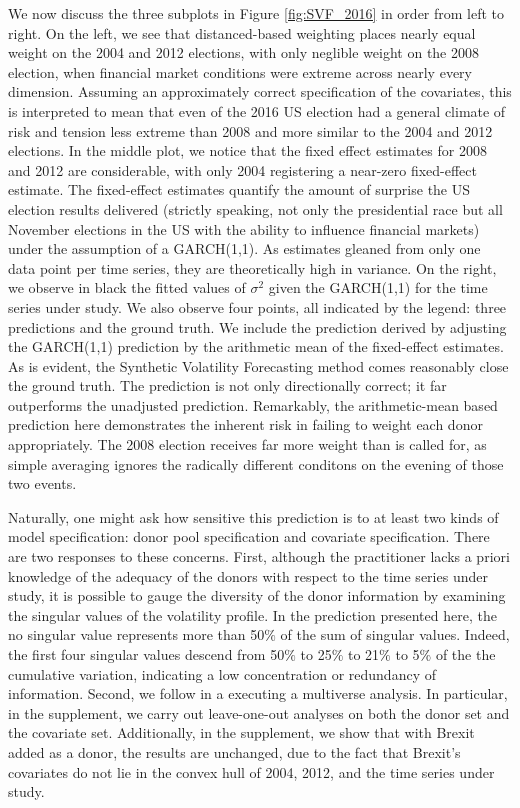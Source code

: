\documentclass[11pt]{article}
\theoremstyle{definition}
\begin{document}
We now discuss the three subplots in Figure \ref{fig:SVF_2016} in order from left to right.  On the left, we see that distanced-based weighting places nearly equal weight on the 2004 and 2012 elections, with only neglible weight on the 2008 election, when financial market conditions were extreme across nearly every dimension.  Assuming an approximately correct specification of the covariates, this is interpreted to mean that even of the 2016 US election had a general climate of risk and tension less extreme than 2008 and more similar to the 2004 and 2012 elections.  In the middle plot, we notice that the fixed effect estimates for 2008 and 2012 are considerable, with only 2004 registering a near-zero fixed-effect estimate.  The fixed-effect estimates quantify the amount of surprise the US election results delivered (strictly speaking, not only the presidential race but all November elections in the US with the ability to influence financial markets) under the assumption of a GARCH(1,1).  As estimates gleaned from only one data point per time series, they are theoretically high in variance.  On the right, we observe in black the fitted values of $\sigma^{2}$ given the GARCH(1,1) for the time series under study.  We also observe four points, all indicated by the legend: three predictions and the ground truth.  We include the prediction derived by adjusting the GARCH(1,1) prediction by the arithmetic mean of the fixed-effect estimates.  As is evident, the Synthetic Volatility Forecasting method comes reasonably close the ground truth.  The prediction is not only directionally correct; it far outperforms the unadjusted prediction.  Remarkably, the arithmetic-mean based prediction here demonstrates the inherent risk in failing to weight each donor appropriately.  The 2008 election receives far more weight than is called for, as simple averaging ignores the radically different conditons on the evening of those two events.  

Naturally, one might ask how sensitive this prediction is to at least two kinds of model specification: donor pool specification and covariate specification.  There are two responses to these concerns.  First, although the practitioner lacks a priori knowledge of the adequacy of the donors with respect to the time series under study, it is possible to gauge the diversity of the donor information by examining the singular values of the volatility profile.  In the prediction presented here, the no singular value represents more than 50$\%$ of the sum of singular values.  Indeed, the first four singular values descend from 50$\%$ to 25$\%$ to 21$\%$ to 5$\%$ of the the cumulative variation, indicating a low concentration or redundancy of information.  Second, we follow \citet{steegen2016increasing} in a executing a multiverse analysis.  In particular, in the supplement, we carry out leave-one-out analyses on both the donor set and the covariate set.  Additionally, in the supplement, we show that with Brexit added as a donor, the results are unchanged, due to the fact that Brexit's covariates do not lie in the convex hull of 2004, 2012, and the time series under study.
\end{document}
